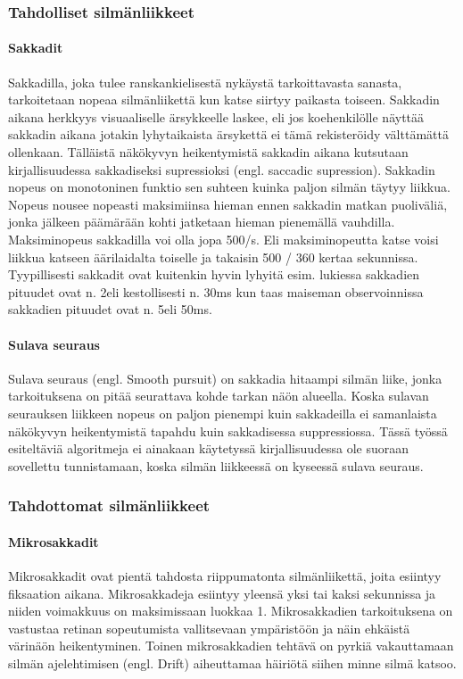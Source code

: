 \subsubsection{Tahdolliset silmänliikkeet}  
\paragraph{Sakkadit}
Sakkadilla, joka tulee ranskankielisestä nykäystä tarkoittavasta sanasta, tarkoitetaan nopeaa silmänliikettä kun katse siirtyy paikasta toiseen. Sakkadin aikana herkkyys visuaaliselle ärsykkeelle laskee, eli jos koehenkilölle näyttää sakkadin aikana jotakin lyhytaikaista ärsykettä ei tämä rekisteröidy välttämättä ollenkaan. Tälläistä näkökyvyn heikentymistä sakkadin aikana kutsutaan kirjallisuudessa sakkadiseksi supressioksi (engl. saccadic supression).\citep[s.899]{matin1974saccadic} Sakkadin nopeus on monotoninen funktio sen suhteen kuinka paljon silmän täytyy liikkua. Nopeus nousee nopeasti maksimiinsa hieman ennen sakkadin matkan puoliväliä, jonka jälkeen päämärään kohti jatketaan hieman pienemällä vauhdilla. Maksiminopeus sakkadilla voi olla jopa 500\degree /s. Eli maksiminopeutta katse voisi liikkua katseen äärilaidalta toiselle ja takaisin 500 / 360 kertaa sekunnissa. Tyypillisesti sakkadit ovat kuitenkin hyvin lyhyitä esim. lukiessa sakkadien pituudet ovat n. 2\degree eli kestollisesti n. 30ms kun taas maiseman observoinnissa sakkadien pituudet ovat n. 5\degree eli 50ms. \citep[s.373]{rayner1998eye}

\paragraph{Sulava seuraus}

Sulava seuraus (engl. Smooth pursuit) on sakkadia hitaampi silmän liike, jonka tarkoituksena on pitää seurattava kohde tarkan näön alueella. Koska sulavan seurauksen liikkeen nopeus on paljon pienempi kuin sakkadeilla ei samanlaista näkökyvyn heikentymistä tapahdu kuin sakkadisessa suppressiossa.\citep[s.373]{rayner1998eye} Tässä työssä esiteltäviä algoritmeja ei ainakaan käytetyssä kirjallisuudessa ole suoraan sovellettu tunnistamaan, koska silmän liikkeessä on kyseessä sulava seuraus. 

\subsubsection{Tahdottomat silmänliikkeet} 
\paragraph{Mikrosakkadit}
Mikrosakkadit ovat pientä tahdosta riippumatonta silmänliikettä, joita esiintyy fiksaation aikana. Mikrosakkadeja esiintyy yleensä yksi tai kaksi sekunnissa ja niiden voimakkuus on maksimissaan luokkaa 1\degree.\citep[s.431]{engbert2004} Mikrosakkadien tarkoituksena on vastustaa retinan sopeutumista vallitsevaan ympäristöön ja näin ehkäistä värinäön heikentyminen.\citep[s.374]{arend1973} Toinen mikrosakkadien tehtävä on pyrkiä vakauttamaan silmän ajelehtimisen (engl. Drift) aiheuttamaa häiriötä siihen minne silmä katsoo.\citep[s.431]{engbert2004}

